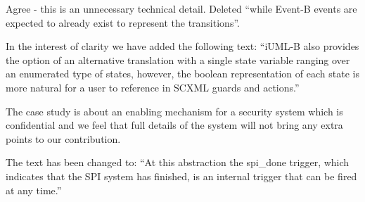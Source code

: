 \documentclass{response}
\begin{document}
\begin{comment}{Reviewer \#3}
Page 4:
  and this as well:

 "while Event-B events are expected to already exist to represent the transitions."
\end{comment}

\begin{response}
	Agree - this is an unnecessary technical detail. Deleted  ``while Event-B events are expected to already exist to represent the transitions''.
\end{response}

\begin{comment}{Reviewer \#3}
  Page 5:

  * It would seem more natural to have one state variable ranging over
  an enumerated type of states, rather than having a Boolean flag for
  each state.
\end{comment}
  
  \begin{response}
    In the interest of clarity we have added the following text: ``iUML-B also provides the option of an alternative translation with a single state variable ranging over an enumerated type of states, however, the boolean representation of each state is more natural for a user to reference in SCXML guards and actions.''
  \end{response}
  
\begin{comment}{Reviewer \#3}

  * Section 3: be more clear about what this system does. Is it just a
  buzz that goes off when a sensor senses something?
\end{comment}

\begin{response}
        The case study is about an enabling mechanism for a security system which is confidential and we feel that full details of the system will not bring any extra points to our contribution.
\end{response}

\begin{comment}{Reviewer \#3}

  * Mid:

  "At this abstraction the spi_done triggered, which ..."
  ->
  " At this abstraction there is only one event, spi_done, which ..."
\end{comment}

\begin{response}
  The text has been changed to: ``At this abstraction the spi\_done trigger, which indicates that the SPI system has finished, is an internal trigger that can be fired at any time.''
\end{response}
\end{document}
